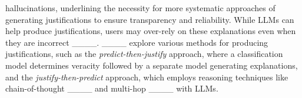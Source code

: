 hallucinations, underlining the necessity for more systematic approaches of generating justifications to ensure transparency and reliability. While LLMs can help produce justifications, users may over-rely on these explanations even when they are incorrect ____. ____ explore various methods for producing justifications, such as the \textit{predict-then-justify} approach, where a classification model determines veracity followed by a separate model generating explanations, and the \textit{justify-then-predict} approach, which employs reasoning techniques like chain-of-thought ____ and multi-hop ____ with LLMs.